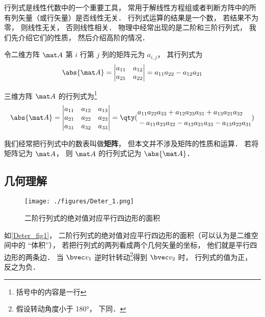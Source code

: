 

行列式是线性代数中的一个重要工具， 常用于解线性方程组或者判断方阵中的所有列矢量（或行矢量）是否线性无关． %
行列式运算的结果是一个数， 若结果不为零， 则线性无关， 否则线性相关． 物理中经常出现的是二阶和三阶行列式， 我们先介绍它们的性质， 然后介绍高阶的情况．

令二维方阵 $\mat A$ 第 $i$ 行第 $j$ 列的矩阵元为 $a_{i,j}$， 其行列式为
\begin{equation}\label{Deter_eq1}
\abs{\mat A} =
\begin{vmatrix}
a_{11} & a_{12} \\
a_{21} & a_{22}
\end{vmatrix} = a_{11}a_{22} - a_{12}a_{21}
\end{equation}

三维方阵 $\mat A$ 的行列式为\footnote{括号中的内容是一行}
\begin{equation}\label{Deter_eq2}
\abs{\mat A} = 
\begin{vmatrix}
a_{11} & a_{12} & a_{13} \\
a_{21} & a_{22} & a_{23} \\
a_{31} & a_{32} & a_{33}
\end{vmatrix}
=
\qty(
\begin{aligned}
&a_{11}a_{22}a_{33} + a_{12}a_{23}a_{31} + a_{13}a_{21}a_{32} \\
&- a_{11}a_{23}a_{32} - a_{12}a_{21}a_{33} - a_{13}a_{22}a_{31}
\end{aligned}
)
\end{equation}

我们经常把行列式中的数表叫做\textbf{矩阵}， 但本文并不涉及矩阵的性质和运算． 若将矩阵记为 $\mat A$， 则 $\mat A$ 的行列式记为 $\abs{\mat A}$．

\subsection{几何理解}

\begin{figure}[ht]
\centering
\texttt{[image: ./figures/Deter\_1.png]}
\caption{二阶行列式的绝对值对应平行四边形的面积} \label{Deter_fig1}
\end{figure}
如\autoref{Deter_fig1}， 二阶行列式的绝对值对应平行四边形的面积（可以认为是二维空间中的 “体积”）， 若把行列式的两列看成两个几何矢量的坐标， 他们就是平行四边形的两条边． 当 $\bvec v_1$ 逆时针转动\footnote{假设转动角度小于 180°， 下同．}得到 $\bvec v_2$ 时， 行列式的值为正， 反之为负．

